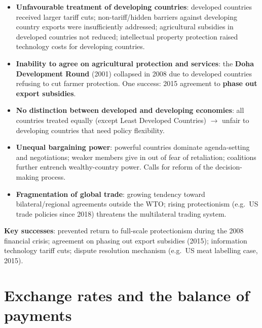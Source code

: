 \documentclass[a4paper,12pt]{article}
\begin{document}
\begin{itemize}
  \item \textbf{Unfavourable treatment of developing countries}: developed countries received larger tariff cuts; non-tariff/hidden barriers against developing country exports were insufficiently addressed; agricultural subsidies in developed countries not reduced; intellectual property protection raised technology costs for developing countries.
  \item \textbf{Inability to agree on agricultural protection and services}: the \textbf{Doha Development Round} (2001) collapsed in 2008 due to developed countries refusing to cut farmer protection. One success: 2015 agreement to \textbf{phase out export subsidies}.
  \item \textbf{No distinction between developed and developing economies}: all countries treated equally (except Least Developed Countries) $\to$ unfair to developing countries that need policy flexibility.
  \item \textbf{Unequal bargaining power}: powerful countries dominate agenda-setting and negotiations; weaker members give in out of fear of retaliation; coalitions further entrench wealthy-country power. Calls for reform of the decision-making process.
  \item \textbf{Fragmentation of global trade}: growing tendency toward bilateral/regional agreements outside the WTO; rising protectionism (e.g.\ US trade policies since 2018) threatens the multilateral trading system.
\end{itemize}
\textbf{Key successes}: prevented return to full-scale protectionism during the 2008 financial crisis; agreement on phasing out export subsidies (2015); information technology tariff cuts; dispute resolution mechanism (e.g.\ US meat labelling case, 2015).
\section{Exchange rates and the balance of payments}\label{sec:exchange-rates}
\end{document}
